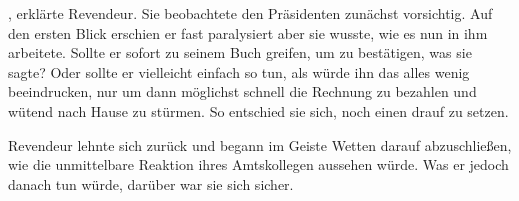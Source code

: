 , erklärte Revendeur.
Sie beobachtete den Präsidenten zunächst vorsichtig.
Auf den ersten Blick erschien er fast paralysiert aber sie wusste, wie es nun in ihm arbeitete.
Sollte er sofort zu seinem Buch greifen, um zu bestätigen, was sie sagte?
Oder sollte er vielleicht einfach so tun, als würde ihn das alles wenig beeindrucken, nur um dann möglichst schnell die Rechnung zu bezahlen und wütend nach Hause zu stürmen.
So entschied sie sich, noch einen drauf zu setzen.

\par

Revendeur lehnte sich zurück und begann im Geiste Wetten darauf abzuschließen, wie die unmittelbare Reaktion ihres Amtskollegen aussehen würde.
Was er jedoch danach tun würde, darüber war sie sich sicher.
